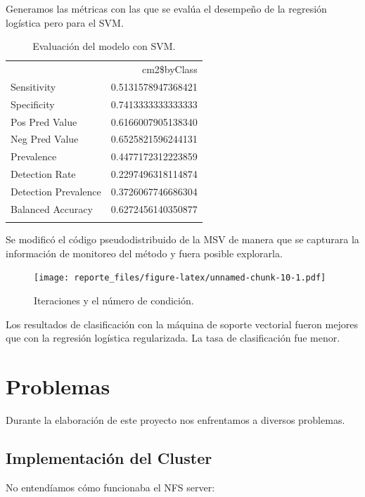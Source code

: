 \documentclass[]{article}
\begin{document}
Generamos las métricas con las que se evalúa el desempeño de la
regresión logística pero para el SVM.

\begin{longtable}[c]{@{}lr@{}}
\toprule\addlinespace
& cm2\$byClass
\\\addlinespace
\midrule\endhead
Sensitivity & 0.5131578947368421
\\\addlinespace
Specificity & 0.7413333333333333
\\\addlinespace
Pos Pred Value & 0.6166007905138340
\\\addlinespace
Neg Pred Value & 0.6525821596244131
\\\addlinespace
Prevalence & 0.4477172312223859
\\\addlinespace
Detection Rate & 0.2297496318114874
\\\addlinespace
Detection Prevalence & 0.3726067746686304
\\\addlinespace
Balanced Accuracy & 0.6272456140350877
\\\addlinespace
\bottomrule
\addlinespace
\caption{Evaluación del modelo con SVM.}
\end{longtable}

Se modificó el código pseudodistribuido de la MSV de manera que se
capturara la información de monitoreo del método y fuera posible
explorarla.

\begin{figure}[htbp]
\centering
\texttt{[image: reporte\_files/figure-latex/unnamed-chunk-10-1.pdf]}
\caption{Iteraciones y el número de condición.}
\end{figure}

Los resultados de clasificación con la máquina de soporte vectorial
fueron mejores que con la regresión logística regularizada. La tasa de
clasificación fue menor.

\pagebreak 

\section{Problemas}\label{problemas}

Durante la elaboración de este proyecto nos enfrentamos a diversos
problemas.

\subsection{Implementación del
Cluster}\label{implementacion-del-cluster}

No entendíamos cómo funcionaba el NFS server:
\end{document}

